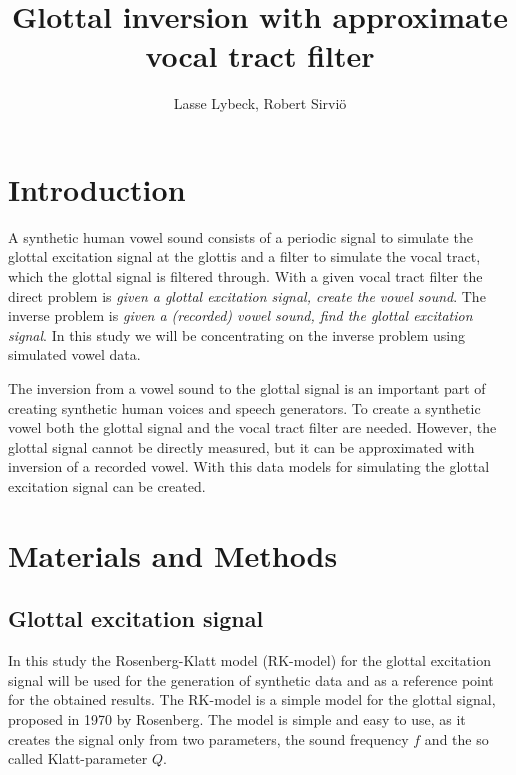 \documentclass[12pt,a4]{article}
\title{Glottal inversion with approximate vocal tract filter}
\author{Lasse Lybeck, Robert Sirviö}
\begin{document}
\maketitle

\section{Introduction}
\label{sec:intro}

A synthetic human vowel sound consists of a periodic signal to simulate the glottal excitation signal at the glottis and a filter to simulate the vocal tract, which the glottal signal is filtered through.\cite{touda} With a given vocal tract filter the direct problem is \emph{given a glottal excitation signal, create the vowel sound}. The inverse problem is \emph{given a (recorded) vowel sound, find the glottal excitation signal}. In this study we will be concentrating on the inverse problem using simulated vowel data.

The inversion from a vowel sound to the glottal signal is an important part of creating synthetic human voices and speech generators. To create a synthetic vowel both the glottal signal and the vocal tract filter are needed. However, the glottal signal cannot be directly measured, but it can be approximated with inversion of a recorded vowel. With this data models for simulating the glottal excitation signal can be created.


\section{Materials and Methods}
\label{sec:methods}

\subsection{Glottal excitation signal}
\label{sec:rk}

In this study the Rosenberg-Klatt model (RK-model) for the glottal excitation signal will be used for the generation of synthetic data and as a reference point for the obtained results. The RK-model is a simple model for the glottal signal, proposed in 1970 by Rosenberg.\cite{rosenberg} The model is simple and easy to use, as it creates the signal only from two parameters, the sound frequency $f$ and the so called Klatt-parameter $Q$.
\end{document}
